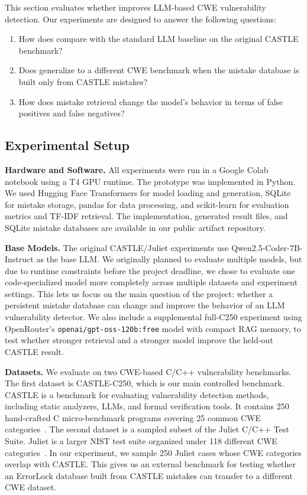 \label{sec:eval}

This section evaluates whether \system improves LLM-based CWE vulnerability detection. Our experiments are designed to answer the following questions:
\begin{enumerate}
    \item How does \system compare with the standard LLM baseline on the original CASTLE benchmark?
    \item Does \system generalize to a different CWE benchmark when the mistake database is built only from CASTLE mistakes?
    \item How does mistake retrieval change the model's behavior in terms of false positives and false negatives?
\end{enumerate}

\subsection{Experimental Setup}

\noindent\textbf{Hardware and Software.}
All experiments were run in a Google Colab notebook using a T4 GPU runtime. The prototype was implemented in Python. We used Hugging Face Transformers for model loading and generation, SQLite for mistake storage, pandas for data processing, and scikit-learn for evaluation metrics and TF-IDF retrieval. The implementation, generated result files, and SQLite mistake databases are available in our public artifact repository.

\noindent\textbf{Base Models.}
The original CASTLE/Juliet experiments use Qwen2.5-Coder-7B-Instruct as the base LLM. We originally planned to evaluate multiple models, but due to runtime constraints before the project deadline, we chose to evaluate one code-specialized model more completely across multiple datasets and experiment settings. This lets us focus on the main question of the project: whether a persistent mistake database can change and improve the behavior of an LLM vulnerability detector. We also include a supplemental full-C250 experiment using OpenRouter's \texttt{openai/gpt-oss-120b:free} model with compact RAG memory, to test whether stronger retrieval and a stronger model improve the held-out CASTLE result.

\noindent\textbf{Datasets.}
We evaluate \system on two CWE-based C/C++ vulnerability benchmarks. The first dataset is CASTLE-C250, which is our main controlled benchmark. CASTLE is a benchmark for evaluating vulnerability detection methods, including static analyzers, LLMs, and formal verification tools. It contains 250 hand-crafted C micro-benchmark programs covering 25 common CWE categories~\cite{castle,castle_github}. The second dataset is a sampled subset of the Juliet C/C++ Test Suite. Juliet is a larger NIST test suite organized under 118 different CWE categories~\cite{juliet_nist}. In our experiment, we sample 250 Juliet cases whose CWE categories overlap with CASTLE. This gives us an external benchmark for testing whether an ErrorLock database built from CASTLE mistakes can transfer to a different CWE dataset.

